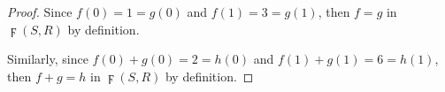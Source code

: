 \begin{Exercise}
\begin{proof}
Since $f(0) = 1 = g(0)$ and $f(1) = 3 = g(1)$, then $f = g$ in $\digamma(S,R)$ by definition.

Similarly, since $f(0)+g(0) = 2 = h(0)$ and $f(1)+g(1) = 6 = h(1)$, then $f+g = h$ in $\digamma(S,R)$ by definition.
\end{proof}
\end{Exercise}